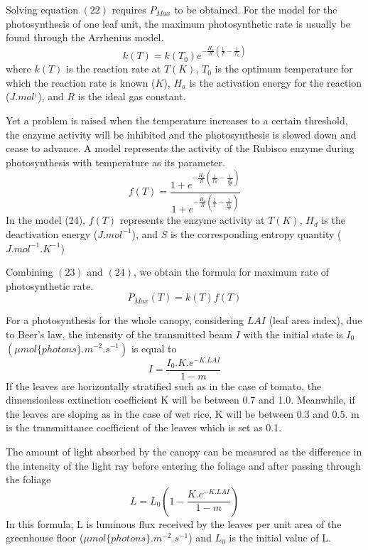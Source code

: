 \documentclass[a4paper]{article}
\begin{document}
Solving equation $(22)$ requires $P_{Max}$ to be obtained. For the model for the photosynthesis of one leaf unit, the maximum photosynthetic rate is usually be found through the Arrhenius model.
\begin{equation}
  k(T) = k(T_0)e^{-\frac{H_a}{R}(\frac{1}{T} - \frac{1}{T_0})}
\end{equation}
where $k(T)$ is the reaction rate at $T (K)$, $T_0$ is the optimum temperature for which the reaction
rate is known ($K$), $H_a$ is the activation energy for the reaction ($J.mol^{_1}$), and $R$ is the ideal gas constant.

Yet a problem is raised when the temperature increases to a certain threshold, the enzyme activity will be inhibited and the photosynthesis is slowed down and cease to advance. A model represents the activity of the Rubisco enzyme during photosynthesis with temperature as its parameter.
\begin{equation}
  f(T) = \frac{1 + e^{-\frac{H_d}{R}( \frac{1}{T_0} - \frac{1}{\frac{H_d}{S}} )}}{1 + e^{-\frac{H_d}{R}(\frac{1}{T} - \frac{1}{\frac{H_d}{S}})}}
\end{equation}
In the model (24), $f(T)$ represents the enzyme activity at $T (K)$, $H_d$ is the deactivation energy ($J.mol^{-1}$), and $S$ is the corresponding entropy quantity ($J.mol^{-1}.K^{-1}$)

Combining $(23)$ and $(24)$, we obtain the formula for maximum rate of photosynthetic rate.
\begin{equation}
  P_{Max}(T) = k(T)f(T)
\end{equation}

For a photosynthesis for the whole canopy, considering $LAI$ (leaf area index), due to Beer's law, the intensity of the transmitted beam $I$ with the initial state is $I_0$ $(\mu mol\{photons\}.m^{-2}.s^{-1})$ is equal to
\begin{equation}
  I = \frac{I_0.K.e^{-K.LAI}}{1 - m}
\end{equation}
If the leaves are horizontally stratified such as in the case of tomato, the dimensionless extinction coefficient K will be between 0.7 and 1.0. Meanwhile, if the leaves are sloping as in the case of wet rice, K will be between 0.3 and 0.5. m is the transmittance coefficient of the leaves which is set as 0.1.

The amount of light absorbed by the canopy can be measured as the difference in the intensity of the light ray before entering the foliage and after passing through the foliage
\begin{equation}
  L =L_0(1 - \frac{K.e^{-K.LAI}}{1 - m})
\end{equation}
In this formula, L is luminous flux received by the leaves per unit area of the greenhouse floor ($\mu mol \{photons\}. m^{-2}. s^{-1}$) and $L_0$ is the initial value of L.
\end{document}
